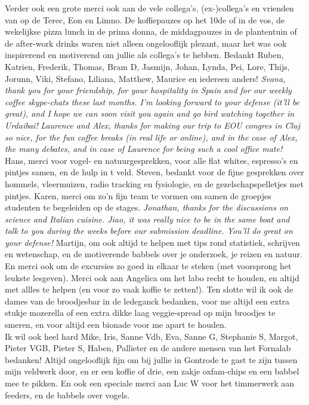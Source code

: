 \documentclass[10pt, twoside]{book} %
\begin{document}
Verder ook een grote merci ook aan de vele collega's, (ex-)collega's en vrienden van op de Terec, Eon en Limno. De koffiepauzes op het 10de of in de vos, de wekelijkse pizza lunch in de prima donna, de middagpauzes in de plantentuin of de after-work drinks waren niet alleen ongelooflijk plezant, maar het was ook inspirerend en motiverend om jullie als collega's te hebben. Bedankt Ruben, Katrien, Frederik, Thomas, Bram D, Jasmijn, Johan, Lynda, Pei, Lore, Thijs, Jorunn, Viki, Stefano, Liliana, Matthew, Maurice en iedereen anders! \textit{Svana, thank you for your friendship, for your hospitality in Spain and for our weekly coffee skype-chats these last months. I'm looking forward to your defense (it'll be great), and I hope we can soon visit you again and go bird watching together in Urdaibai!} \textit{Laurence and Alex, thanks for making our trip to EOU congres in Cluj so nice, for the fun coffee breaks (in real life or online), and in the case of Alex, the many debates, and in case of Laurence for being such a cool office mate!} Hans, merci voor vogel- en natuurgesprekken, voor alle flat whites, espresso's en pintjes samen, en de hulp in t veld. Steven, bedankt voor de fijne gesprekken over hommels, vleermuizen, radio tracking en fysiologie, en de gezelschapspelletjes met pintjes. Karen, merci om zo'n fijn team te vormen om samen de groepjes studenten te begeleiden op de stages. \textit{Jonathan, thanks for the discussions on science and Italian cuisine. Jiao, it was really nice to be in the same boat and talk to you during the weeks before our submission deadline. You'll do great on your defense!} Martijn, om ook altijd te helpen met tips rond statistiek, schrijven en wetenschap, en de motiverende babbels over je onderzoek, je reizen en natuur. En merci ook om de excursies zo goed in elkaar te steken (met voorsprong het leukste lesgeven). Merci ook aan Angelica om het labo recht te houden, en altijd met allles te helpen (en voor zo vaak koffie te zetten!). Ten slotte wil ik ook de dames van de broodjesbar in de ledeganck bedanken, voor me altijd een extra stukje mozerella of een extra dikke laag veggie-spread op mijn broodjes te smeren, en voor altijd een bionade voor me apart te houden.\\

Ik wil ook heel hard Mike, Iris, Sanne Vdb, Eva, Sanne G, Stephanie S, Margot, Pieter VGB, Pieter S, Haben, Pallieter en de andere mensen van het Fornalab bedanken! Altijd ongelooflijk fijn om bij jullie in Gontrode te gast te zijn tussen mijn veldwerk door, en er een koffie of drie, een zakje oxfam-chips en een babbel mee te pikken. En ook een speciale merci aan Luc W voor het timmerwerk aan feeders, en de babbels over vogels.\\
\end{document}
